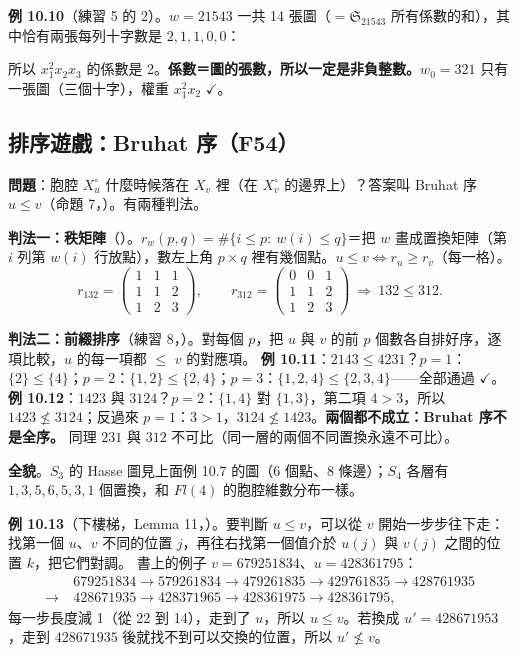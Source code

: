 \textbf{例 10.10}（練習 5 的 2）。$w=21543$ 一共 14 張圖（$=\mathfrak S_{21543}$ 所有係數的和），其中恰有兩張每列十字數是 $2,1,1,0,0$：
\begin{center}
\FulPipesTOFFT
\end{center}
所以 $x_1^2x_2x_3$ 的係數是 2。\textbf{係數＝圖的張數，所以一定是非負整數。}$w_0=321$ 只有一張圖（三個十字），權重 $x_1^2x_2$ $\checkmark$。

\subsection{排序遊戲：Bruhat 序（F54）}\label{sec:f-bruhat}

\textbf{問題}：胞腔 $X^\circ_u$ 什麼時候落在 $X_v$ 裡（在 $X^\circ_v$ 的邊界上）？答案叫 Bruhat 序 $u\le v$（命題 7，）。有兩種判法。

\textbf{判法一：秩矩陣}（）。$r_w(p,q)=\#\{i\le p:\ w(i)\le q\}$＝把 $w$ 畫成置換矩陣（第 $i$ 列第 $w(i)$ 行放點），數左上角 $p\times q$ 裡有幾個點。$u\le v\iff r_u\ge r_v$（每一格）。
\[
r_{132}=\begin{pmatrix}1&1&1\\1&1&2\\1&2&3\end{pmatrix},\qquad r_{312}=\begin{pmatrix}0&0&1\\1&1&2\\1&2&3\end{pmatrix}\ \Longrightarrow\ 132\le312 .
\]

\textbf{判法二：前綴排序}（練習 8，）。對每個 $p$，把 $u$ 與 $v$ 的前 $p$ 個數各自排好序，逐項比較，$u$ 的每一項都 $\le$ $v$ 的對應項。
\textbf{例 10.11}：$2143\le4231$？$p=1$：$\{2\}\le\{4\}$；$p=2$：$\{1,2\}\le\{2,4\}$；$p=3$：$\{1,2,4\}\le\{2,3,4\}$——全部通過 $\checkmark$。
\textbf{例 10.12}：$1423$ 與 $3124$？$p=2$：$\{1,4\}$ 對 $\{1,3\}$，第二項 $4>3$，所以 $1423\not\le3124$；反過來 $p=1$：$3>1$，$3124\not\le1423$。\textbf{兩個都不成立：Bruhat 序不是全序。}
同理 $231$ 與 $312$ 不可比（同一層的兩個不同置換永遠不可比）。

\textbf{全貌}。$S_3$ 的 Hasse 圖見上面例 10.7 的圖（6 個點、8 條邊）；$S_4$ 各層有 $1,3,5,6,5,3,1$ 個置換，和 $Fl(4)$ 的胞腔維數分布一樣。

\textbf{例 10.13}（下樓梯，Lemma 11，）。要判斷 $u\le v$，可以從 $v$ 開始一步步往下走：找第一個 $u$、$v$ 不同的位置 $j$，再往右找第一個值介於 $u(j)$ 與 $v(j)$ 之間的位置 $k$，把它們對調。
書上的例子 $v=679251834$、$u=428361795$：
\[
\begin{aligned}
&679251834\to579261834\to479261835\to429761835\to428761935\\
\to\ &428671935\to428371965\to428361975\to428361795,
\end{aligned}
\]
每一步長度減 1（從 22 到 14），走到了 $u$，所以 $u\le v$。若換成 $u'=428671953$，走到 $428671935$ 後就找不到可以交換的位置，所以 $u'\not\le v$。

